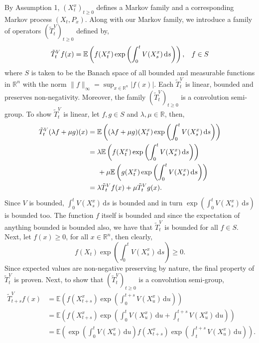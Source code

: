 \documentclass[a4paper,12pt,draft]{report}
\begin{document}
By Assumption 1, $(X_t^x)_{t \ge 0}$ defines a Markov family and a corresponding Markov process $(X_t, P_x)$.  Along with our Markov family, we introduce a family of operators $(\tilde{T}_t^V)_{t \ge 0}$ defined by,
$$
\tilde{T}_t^Vf(x) = \mathbb{E}\left(f(X_t^x)\exp\left(\int_0^t V(X_s^x)\,\mathrm{d}s\right)\right), \hspace{0.3cm} f \in S
$$
where $S$ is taken to be the Banach space of all bounded and measurable functions in $\mathbb{R}^n$ with the norm $\|f\|_\infty = \sup_{x \in \mathbb{R}^n}|f(x)|$.
\lemma
{
Each $\tilde{T}_t^V$ is linear, bounded and preserves non-negativity.  Moreover, the family $(\tilde{T}_t^V)_{t \ge 0}$ is a convolution semi-group.
}
\proof
{
To show $\tilde{T}_t^V$ is linear, let $f, g \in S$ and $\lambda, \mu \in \mathbb{R}$, then,
\begin{align}
\tilde{T}_t^V(\lambda f + \mu g)(x) & = \mathbb{E}\left((\lambda f + \mu g)(X_t^x)\exp\left(\int_0^t V(X_s^x)\,\mathrm{d}s\right)\right)\nonumber\\
& = \lambda \mathbb{E}\left(f(X_t^x)\exp\left(\int_0^t V(X_s^x)\,\mathrm{d}s\right)\right)\nonumber\\
& \hspace{0.5cm} + \mu \mathbb{E}\left(g(X_t^x)\exp\left(\int_0^t V(X_s^x)\,\mathrm{d}s\right)\right)\nonumber\\
& = \lambda\tilde{T}_t^Vf(x) + \mu\tilde{T}_t^Vg(x)\nonumber.
\end{align}
Since $V$ is bounded, $\int_0^tV(X_s^x)\,\mathrm{d}s$ is bounded and in turn $\exp\left(\int_0^tV(X_s^x)\,\mathrm{d}s\right)$ is bounded too.  The function $f$ itself is bounded and since the expectation of anything bounded is bounded also, we have that $\tilde{T}_t^V$ is bounded for all $f \in S$.  Next, let $f(x) \ge 0$, for all $x \in \mathbb{R}^n$, then clearly,
$$
f(X_t)\exp\left(\int_0^t V(X_s^x)\,\mathrm{d}s\right) \ge 0.
$$
Since expected values are non-negative preserving by nature, the final property of $\tilde{T}_t^V$ is proven.
Next, to show that $(\tilde{T}_t^V)_{t \ge 0}$ is a convolution semi-group,
\begin{align}
\tilde{T}_{t + s}^Vf(x) & = \mathbb{E}\left(f(X_{t + s}^x)\exp\left(\int_0^{t + s} V(X_u^x)\,\mathrm{d}u\right)\right)\nonumber\\
& = \mathbb{E}\left(f(X_{t + s}^x)\exp\left(\int_0^t V(X_u^x)\,\mathrm{d}u + \int_t^{t + s} V(X_u^x)\,\mathrm{d}u\right)\right)\nonumber\\
& = \mathbb{E}\left(\exp\left(\int_0^t V(X_u^x)\,\mathrm{d}u\right)f(X_{t + s}^x)\exp\left(\int_t^{t + s} V(X_u^x)\,\mathrm{d}u\right)\right).\nonumber

\end{align}}
\end{document}
